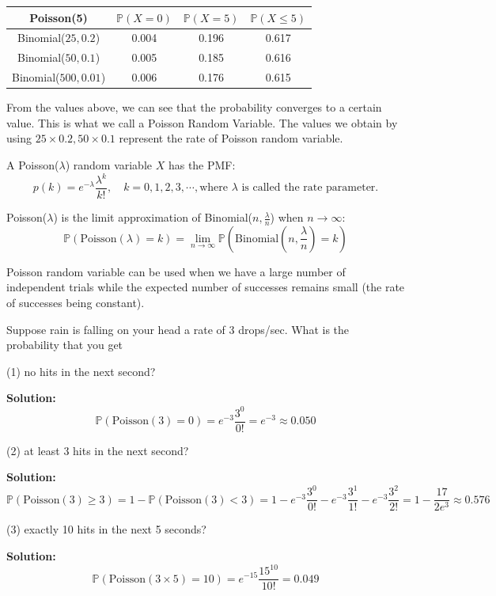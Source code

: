 \begin{table}[H]
  \centering
  \begin{tabular}{c|c|c|c}
      \toprule
      Poisson(5) & \(\mathbb{P}(X = 0)\) & \(\mathbb{P}(X = 5)\) & \(\mathbb{P}(X \leq 5)\)  \\
    \midrule
      Binomial(\(25, 0.2\)) & 0.004 & 0.196 & 0.617  \\
      Binomial(\(50, 0.1\)) & 0.005 & 0.185 & 0.616  \\
      Binomial(\(500, 0.01\)) & 0.006 & 0.176 & 0.615  \\
      \bottomrule
  \end{tabular}
\end{table}

From the values above, we can see that the probability converges to a certain value. This is what we call a Poisson Random Variable. The values we obtain by using \(25 \times 0.2, 50 \times 0.1\) represent the rate of Poisson random variable.

\begin{definition}
  A Poisson(\(\lambda\)) random variable \(X\) has the PMF:
  \[
    p(k) = e^{-\lambda}\dfrac{\lambda^k}{k!}, \quad k = 0, 1, 2, 3, \cdots, \text{where \(\lambda\) is called the rate parameter.}
  \]
\end{definition}

\begin{theorem}
  Poisson(\(\lambda\)) is the limit approximation of Binomial(\(n, \frac{\lambda}{n}\)) when \(n \to \infty\): 
  \[
    \mathbb{P}(\text{Poisson}(\lambda) = k) = \lim_{n \to \infty} \mathbb{P}(\text{Binomial}(n, \dfrac{\lambda}{n}) = k)
  \]
\end{theorem}

Poisson random variable can be used when we have a large number of independent trials while the expected number of successes remains small (the rate of successes being constant). 

\begin{eg}
  Suppose rain is falling on your head a rate of 3 drops/sec. What is the probability that you get 
  
  (1) no hits in the next second? 
  
  \textbf{Solution:} 
  \[
    \mathbb{P}(\text{Poisson}(3) = 0) = e^{-3}\dfrac{3^0}{0!} = e^{-3} \approx 0.050
  \]

  (2) at least 3 hits in the next second? 

  \textbf{Solution:} 
  \[
    \mathbb{P}(\text{Poisson}(3) \geq 3) = 1 - \mathbb{P}(\text{Poisson}(3) < 3) = 1 - e^{-3}\dfrac{3^0}{0!} - e^{-3}\dfrac{3^1}{1!} - e^{-3}\dfrac{3^2}{2!} = 1 - \dfrac{17}{2 e^{3}} \approx 0.576
  \]

  (3) exactly 10 hits in the next 5 seconds?

  \textbf{Solution:} 
  \[
    \mathbb{P}(\text{Poisson}(3 \times 5) = 10) = e^{-15}\dfrac{15^{10} }{10!} = 0.049
  \]
\end{eg}

